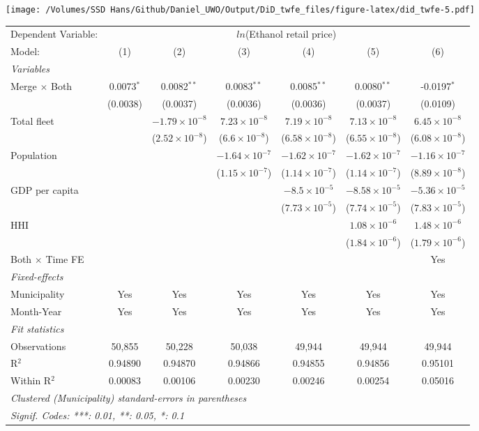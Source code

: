 \documentclass[
]{article}
\begin{document}
\texttt{[image: /Volumes/SSD Hans/Github/Daniel\_UWO/Output/DiD\_twfe\_files/figure-latex/did\_twfe-5.pdf]}

\begin{tabular}{lcccccc}
\tabularnewline\midrule\midrule
Dependent Variable:&\multicolumn{6}{c}{$ln$(Ethanol retail price)}\\
Model:&(1) & (2) & (3) & (4) & (5) & (6)\\
\midrule \emph{Variables}&   &   &   &   &   &  \\
Merge $\times $ Both & 0.0073$^{*}$ & 0.0082$^{**}$ & 0.0083$^{**}$ & 0.0085$^{**}$ & 0.0080$^{**}$ & -0.0197$^{*}$\\
  &(0.0038) & (0.0037) & (0.0036) & (0.0036) & (0.0037) & (0.0109)\\
Total fleet &    & $-1.79\times 10^{-8}$ & $7.23\times 10^{-8}$ & $7.19\times 10^{-8}$ & $7.13\times 10^{-8}$ & $6.45\times 10^{-8}$\\
  &   & ($2.52\times 10^{-8}$) & ($6.6\times 10^{-8}$) & ($6.58\times 10^{-8}$) & ($6.55\times 10^{-8}$) & ($6.08\times 10^{-8}$)\\
Population &    &    & $-1.64\times 10^{-7}$ & $-1.62\times 10^{-7}$ & $-1.62\times 10^{-7}$ & $-1.16\times 10^{-7}$\\
  &   &    & ($1.15\times 10^{-7}$) & ($1.14\times 10^{-7}$) & ($1.14\times 10^{-7}$) & ($8.89\times 10^{-8}$)\\
GDP per capita &    &    &    & $-8.5\times 10^{-5}$ & $-8.58\times 10^{-5}$ & $-5.36\times 10^{-5}$\\
  &   &    &    & ($7.73\times 10^{-5}$) & ($7.74\times 10^{-5}$) & ($7.83\times 10^{-5}$)\\
HHI &    &    &    &    & $1.08\times 10^{-6}$ & $1.48\times 10^{-6}$\\
  &   &    &    &    & ($1.84\times 10^{-6}$) & ($1.79\times 10^{-6}$)\\
Both $\times$ Time FE &  &  &  &  &  & Yes\\
\midrule \emph{Fixed-effects}&   &   &   &   &   &  \\
Municipality & Yes & Yes & Yes & Yes & Yes & Yes\\
Month-Year & Yes & Yes & Yes & Yes & Yes & Yes\\
\midrule \emph{Fit statistics}&  & & & & & \\
Observations & 50,855&50,228&50,038&49,944&49,944&49,944\\
R$^2$ & 0.94890&0.94870&0.94866&0.94855&0.94856&0.95101\\
Within R$^2$ & 0.00083&0.00106&0.00230&0.00246&0.00254&0.05016\\
\midrule\midrule\multicolumn{7}{l}{\emph{Clustered (Municipality) standard-errors in parentheses}}\\
\multicolumn{7}{l}{\emph{Signif. Codes: ***: 0.01, **: 0.05, *: 0.1}}\\
\end{tabular}
\end{document}
